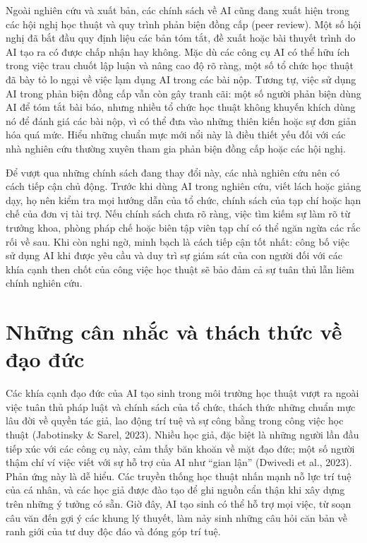 Ngoài nghiên cứu và xuất bản, các chính sách về AI cũng đang xuất hiện trong các hội nghị học thuật và quy trình phản biện đồng cấp (peer review). Một số hội nghị đã bắt đầu quy định liệu các bản tóm tắt, đề xuất hoặc bài thuyết trình do AI tạo ra có được chấp nhận hay không. Mặc dù các công cụ AI có thể hữu ích trong việc trau chuốt lập luận và nâng cao độ rõ ràng, một số tổ chức học thuật đã bày tỏ lo ngại về việc lạm dụng AI trong các bài nộp. Tương tự, việc sử dụng AI trong phản biện đồng cấp vẫn còn gây tranh cãi: một số người phản biện dùng AI để tóm tắt bài báo, nhưng nhiều tổ chức học thuật không khuyến khích dùng nó để đánh giá các bài nộp, vì có thể đưa vào những thiên kiến hoặc sự đơn giản hóa quá mức. Hiểu những chuẩn mực mới nổi này là điều thiết yếu đối với các nhà nghiên cứu thường xuyên tham gia phản biện đồng cấp hoặc các hội nghị.

Để vượt qua những chính sách đang thay đổi này, các nhà nghiên cứu nên có cách tiếp cận chủ động. Trước khi dùng AI trong nghiên cứu, viết lách hoặc giảng dạy, họ nên kiểm tra mọi hướng dẫn của tổ chức, chính sách của tạp chí hoặc hạn chế của đơn vị tài trợ. Nếu chính sách chưa rõ ràng, việc tìm kiếm sự làm rõ từ trưởng khoa, phòng pháp chế hoặc biên tập viên tạp chí có thể ngăn ngừa các rắc rối về sau. Khi còn nghi ngờ, minh bạch là cách tiếp cận tốt nhất: công bố việc sử dụng AI khi được yêu cầu và duy trì sự giám sát của con người đối với các khía cạnh then chốt của công việc học thuật sẽ bảo đảm cả sự tuân thủ lẫn liêm chính nghiên cứu.

\section{Những cân nhắc và thách thức về đạo đức}

Các khía cạnh đạo đức của AI tạo sinh trong môi trường học thuật vượt ra ngoài việc tuân thủ pháp luật và chính sách của tổ chức, thách thức những chuẩn mực lâu đời về quyền tác giả, lao động trí tuệ và sự công bằng trong công việc học thuật (Jabotinsky \& Sarel, 2023). Nhiều học giả, đặc biệt là những người lần đầu tiếp xúc với các công cụ này, cảm thấy băn khoăn về mặt đạo đức; một số người thậm chí ví việc viết với sự hỗ trợ của AI như ``gian lận'' (Dwivedi et al., 2023). Phản ứng này là dễ hiểu. Các truyền thống học thuật nhấn mạnh nỗ lực trí tuệ của cá nhân, và các học giả được đào tạo để ghi nguồn cẩn thận khi xây dựng trên những ý tưởng có sẵn. Giờ đây, AI tạo sinh có thể hỗ trợ mọi việc, từ soạn câu văn đến gợi ý các khung lý thuyết, làm nảy sinh những câu hỏi căn bản về ranh giới của tư duy độc đáo và đóng góp trí tuệ.

